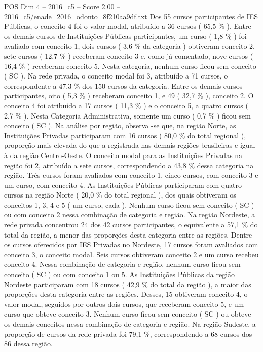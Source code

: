 \begin{textsample}{POS Dim 4 – 2016\_c5 – Score 2.00 – 2016\_c5/enade\_2016\_odonto\_8f210aa9df.txt}
Dos 55 cursos participantes de IES Públicas, o conceito 4 foi o valor modal, atribuído a 36 cursos ( 65,5 \% ).
Entre os demais cursos de Instituições Públicas participantes, um curso ( 1,8 \% ) foi avaliado com conceito 1, dois cursos ( 3,6 \% da categoria ) obtiveram conceito 2, sete cursos ( 12,7 \% ) receberam conceito 3 e, como já comentado, nove cursos ( 16,4 \% ) receberam conceito 5.
Nesta categoria, nenhum curso ficou sem conceito ( SC ).
Na rede privada, o conceito modal foi 3, atribuído a 71 cursos, o correspondente a 47,3 \% dos 150 cursos da categoria.
Entre os demais cursos participantes, oito ( 5,3 \% ) receberam conceito 1, e 49 ( 32,7 \% ), conceito 2.
O conceito 4 foi atribuído a 17 cursos ( 11,3 \% ) e o conceito 5, a quatro cursos ( 2,7 \% ).
Nesta Categoria Administrativa, somente um curso ( 0,7 \% ) ficou sem conceito ( SC ).
Na análise por região, observa -se que, na região Norte, as Instituições Privadas participaram com 16 cursos ( 80,0 \% do total regional ), proporção mais elevada do que a registrada nas demais regiões brasileiras e igual à da região Centro-Oeste.
O conceito modal para as Instituições Privadas na região foi 2, atribuído a sete cursos, correspondendo a 43,8 \% dessa categoria na região.
Três cursos foram avaliados com conceito 1, cinco cursos, com conceito 3 e um curso, com conceito 4.
As Instituições Públicas participaram com quatro cursos na região Norte ( 20,0 \% do total regional ), dos quais obtiveram os conceitos 1, 3, 4 e 5 ( um curso, cada ).
Nenhum curso ficou sem conceito ( SC ) ou com conceito 2 nessa combinação de categoria e região.
Na região Nordeste, a rede privada concentrou 24 dos 42 cursos participantes, o equivalente a 57,1 \% do total da região, a menor das proporções desta categoria entre as regiões.
Dentre os cursos oferecidos por IES Privadas no Nordeste, 17 cursos foram avaliados com conceito 3, o conceito modal.
Seis cursos obtiveram conceito 2 e um curso recebeu conceito 4.
Nessa combinação de categoria e região, nenhum curso ficou sem conceito ( SC ) ou com conceito 1 ou 5.
As Instituições Públicas da região Nordeste participaram com 18 cursos ( 42,9 \% do total da região ), a maior das proporções desta categoria entre as regiões.
Desses, 15 obtiveram conceito 4, o valor modal, seguidos por outros dois cursos, que receberam conceito 5, e um curso que obteve conceito 3.
Nenhum curso ficou sem conceito ( SC ) ou obteve os demais conceitos nessa combinação de categoria e região.
Na região Sudeste, a proporção de cursos da rede privada foi 79,1 \%, correspondendo a 68 cursos dos 86 dessa região.

\end{textsample}
